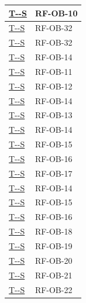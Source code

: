 \documentclass[a4paper,12pt]{article}
\newcounter{testsys}
\newcommand{\systestref}{%
  \hyperlink{T-\arabic{testsys}-S}{T-\arabic{testsys}-S}%
}
\begin{document}
\begin{center}
\begin{longtable}{|>{\centering\arraybackslash}p{5cm}|>{\centering\arraybackslash}p{9cm}|}
\stepcounter{testsys}
\systestref & RF-OB-10 \\
\hline

\stepcounter{testsys}
\systestref & RF-OB-32 \\
\hline

\stepcounter{testsys}
\systestref & RF-OB-32 \\
\hline

\stepcounter{testsys}
\systestref & RF-OB-14 \\
\hline

\stepcounter{testsys}
\systestref & RF-OB-11 \\
\hline

\stepcounter{testsys}
\systestref & RF-OB-12 \\
\hline

\stepcounter{testsys}
\systestref & RF-OB-14 \\
\hline

\stepcounter{testsys}
\systestref & RF-OB-13 \\
\hline

\stepcounter{testsys}
\systestref & RF-OB-14 \\
\hline

\stepcounter{testsys}
\systestref & RF-OB-15 \\
\hline

\stepcounter{testsys}
\systestref & RF-OB-16 \\
\hline

\stepcounter{testsys}
\systestref & RF-OB-17 \\
\hline

\stepcounter{testsys}
\systestref & RF-OB-14 \\
\hline

\stepcounter{testsys}
\systestref & RF-OB-15 \\
\hline

\stepcounter{testsys}
\systestref & RF-OB-16 \\
\hline

\stepcounter{testsys}
\systestref & RF-OB-18 \\
\hline

\stepcounter{testsys}
\systestref & RF-OB-19 \\
\hline

\stepcounter{testsys}
\systestref & RF-OB-20 \\
\hline

\stepcounter{testsys}
\systestref & RF-OB-21 \\
\hline

\stepcounter{testsys}
\systestref & RF-OB-22 \\
\hline


\end{longtable}
\end{center}
\end{document}
